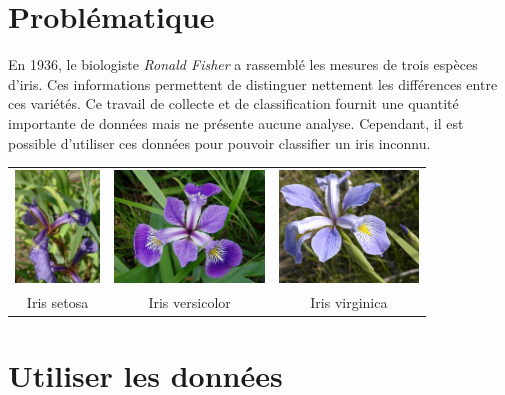 \documentclass[a4paper,11pt]{article}
\begin{document}
\section{Problématique}
En 1936, le biologiste \emph{Ronald Fisher} a rassemblé les mesures de trois espèces d'iris. Ces informations permettent de distinguer nettement les différences entre ces variétés. Ce travail de collecte et de classification fournit une quantité importante de données mais ne présente aucune analyse. Cependant, il est possible d'utiliser ces données pour pouvoir classifier un iris inconnu.
\begin{center}
    \begin{tabular}{ccc}
        \includegraphics[height=3cm]{ressources/iris-setosa.jpg}&
        \includegraphics[height=3cm]{ressources/iris-versicolor.jpg}&
        \includegraphics[height=3cm]{ressources/iris-virginica.jpg}\\
        Iris setosa & Iris versicolor & Iris virginica\\
    \end{tabular}
\end{center}
\begin{center}
\end{center}
\section{Utiliser les données}
\end{document}
